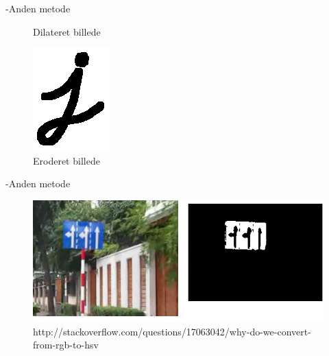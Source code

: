\begin{frame}[fragile]{\insertsection}{\insertsubsection -Anden metode}
\begin{itemize}
\begin{figure}
\begin{minipage}{.30\textwidth}
				\caption{Dilateret billede}
			\end{minipage}
			\begin{minipage}{.30\textwidth}
				\includegraphics[width=.7\textwidth]{pictures/i_eroded.png}
				\caption{Eroderet billede}
			\end{minipage}
		\end{figure}
	\end{itemize}
\end{frame}

\begin{frame}[fragile]{\insertsection}{\insertsubsection -Anden metode}
	\begin{figure}
		\begin{minipage}{.9\textwidth}
			\includegraphics[width=\textwidth]{pictures/rgbhsv.png}
			\caption{http://stackoverflow.com/questions/17063042/why-do-we-convert-from-rgb-to-hsv}
		\end{minipage}
	\end{figure}
\end{frame}
